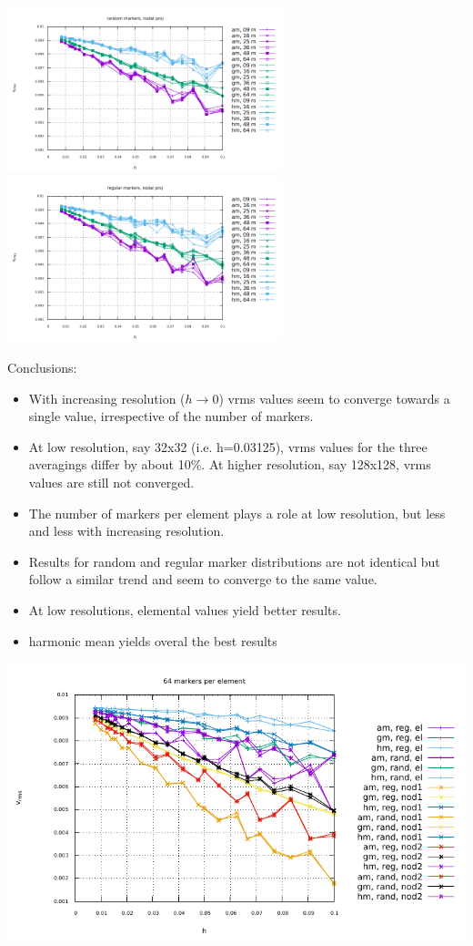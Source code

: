 \begin{center}
\includegraphics[width=8cm]{python_codes/fieldstone_markers_avrg/vrms_rand_proj3} 
\includegraphics[width=8cm]{python_codes/fieldstone_markers_avrg/vrms_norand_proj3}\\ 
\end{center}

Conclusions:
\begin{itemize}
\item
With increasing resolution ($h\rightarrow 0$) vrms values seem to converge towards a single value, irrespective 
of the number of markers. 

\item
At low resolution, say 32x32 (i.e. h=0.03125), vrms values for the three averagings differ by about 10\%. At higher resolution, say 128x128, vrms values are still not converged.  

\item
The number of markers per element plays a role at low resolution, but less and less with increasing resolution. 

\item
Results for random and regular marker distributions are not identical but follow a similar trend and seem to converge to 
the same value.

\item
At low resolutions, elemental values yield better results.

\item harmonic mean yields overal the best results
\end{itemize}

\includegraphics[width=15cm]{python_codes/fieldstone_markers_avrg/vrms} 
